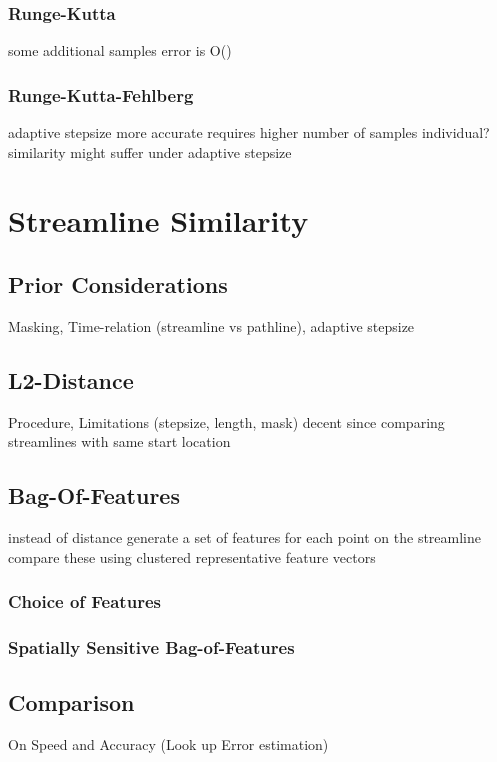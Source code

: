 \subsection{Runge-Kutta}
some additional samples
error is O()
\subsection{Runge-Kutta-Fehlberg}
adaptive stepsize
more accurate
requires higher number of samples
individual?
similarity might suffer under adaptive stepsize
\chapter{Streamline Similarity}
\section{Prior Considerations}
Masking, Time-relation (streamline vs pathline), adaptive stepsize
\section{L2-Distance}
Procedure, Limitations (stepsize, length, mask)
decent since comparing streamlines with same start location
\section{Bag-Of-Features}
instead of distance generate a set of features for each point on the streamline
compare these using clustered representative feature vectors
\subsection{Choice of Features}

\subsection{Spatially Sensitive Bag-of-Features}
\section{Comparison}
On Speed and Accuracy
(Look up Error estimation)